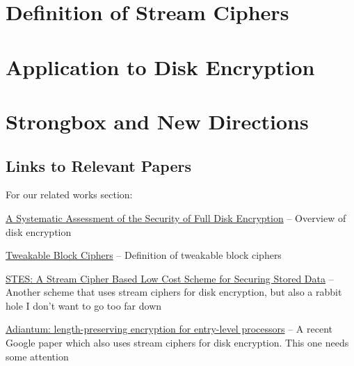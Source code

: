 \documentclass[11pt]{article}
\begin{document}
	\section{Definition of Stream Ciphers}
	
	
	\section{Application to Disk Encryption}

	\section{Strongbox and New Directions}
	
	\subsection{Links to Relevant Papers}
	
	For our related works section:
	
	\begin{description}[font=$\bullet$~\normalfont\scshape\color{red!50!black}]
		\item \href{https://ieeexplore.ieee.org/abstract/document/6951337}{A Systematic Assessment of the Security of Full Disk Encryption} -- Overview of disk encryption
		\item \href{https://people.eecs.berkeley.edu/~daw/papers/tweak-joc.pdf}{Tweakable Block Ciphers} -- Definition of tweakable block ciphers
		\item \href{https://ieeexplore.ieee.org/abstract/document/6945842}{STES: A Stream Cipher Based Low Cost Scheme for Securing Stored Data} -- Another scheme that uses stream ciphers for disk encryption, but also a rabbit hole I don't want to go too far down
		\item \href{https://eprint.iacr.org/2018/720}{Adiantum: length-preserving encryption for
			entry-level processors} -- A recent Google paper which also uses stream ciphers for disk encryption. This one needs some attention
		\item \href{}{}
	\end{description}
	
	
	
\end{document}
